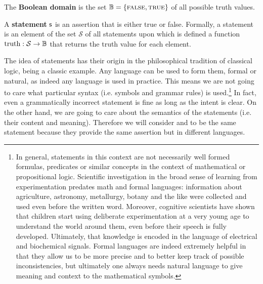 \documentclass[11pt,letterpaper,fleqn]{memoir} %
\begin{document}
\begin{mathSection}
\begin{defn}
	The \textbf{Boolean domain} is the set $\mathbb{B} = \{\textsc{false}, \textsc{true}\}$ of all possible truth values.
\end{defn}


\begin{axiom}\label{ax_statement}
	A \textbf{statement} $\mathsf{s}$ is an assertion that is either true or false. Formally, a statement is an element of the set $\mathcal{S}$ of all statements upon which is defined a function $\operatorname{truth}: \mathcal{S} \to \mathbb{B}$ that returns the truth value for each element.
\end{axiom}

\end{mathSection}

The idea of statements has their origin in the philosophical tradition of classical logic,  being a classic example. Any language can be used to form them, formal or natural, as indeed any language is used in practice. This means we are not going to care what particular syntax (i.e. symbols and grammar rules) is used.\footnote{In general, statements in this context are not necessarily well formed formulas, predicates or similar concepts in the context of mathematical or propositional logic. Scientific investigation in the broad sense of learning from experimentation predates math and formal languages: information about agriculture, astronomy, metallurgy, botany and the like were collected and used even before the written word. Moreover, cognitive scientists have shown that children start using deliberate experimentation at a very young age to understand the world around them, even before their speech is fully developed. Ultimately, that knowledge is encoded in the language of electrical and biochemical signals. Formal languages are indeed extremely helpful in that they allow us to be more precise and to better keep track of possible inconsistencies, but ultimately one always needs natural language to give meaning and context to the mathematical symbols.} In fact, even a grammatically incorrect statement is fine as long as the intent is clear. On the other hand, we are going to care about the semantics of the statements (i.e. their content and meaning). Therefore we will consider  and  to be the same statement because they provide the same assertion but in different languages.
\end{document}
